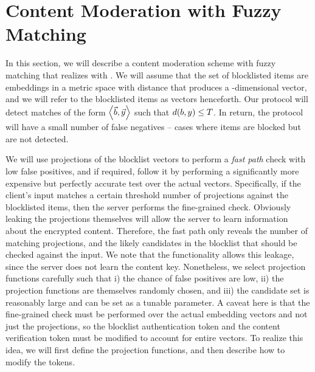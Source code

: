 \section{Content Moderation with Fuzzy Matching}
%


In this section, we will describe a content moderation scheme with fuzzy matching that realizes \contentModFunc with \checkContentFuzzy . We will assume that the set of blocklisted items are embeddings in a metric space with distance \distance that produces a \genericVecLen-dimensional vector, and we will refer to 
the blocklisted items as vectors henceforth. 
Our protocol will detect matches of the form $\tupleDefn{\blocklistVec, \clientVec}$ such that 
$\distanceNotation[\distance][\genericBlocklistElmt][\genericCInputElmt] \le \threshold$. In return, the protocol will have a small number of false negatives -- cases where items are blocked but are not detected. 






%
We will use projections of the blocklist vectors to perform a \emph{fast path} check with low false positives, and if required, follow it by performing  a significantly more expensive but perfectly accurate test over the actual vectors. Specifically, if the client's input matches a certain threshold number of projections against the blocklisted items, then the server performs the fine-grained check. Obviously leaking the projections themselves will allow the server to learn information about the encrypted content. Therefore, the fast path only reveals the number of matching projections, and the likely candidates in the blocklist that should be checked against the input. We note that the \contentModFunc functionality allows this leakage, since the server does not learn the content key.  Nonetheless, we select projection functions carefully such that i) the chance of false positives are low, ii) the projection functions are themselves randomly chosen, and iii) the candidate set is reasonably large and can be set as a tunable parameter. A caveat here is that the fine-grained check must be performed over the actual embedding vectors and not just the projections, so the blocklist authentication token and the content verification token must be modified to account for entire vectors. To realize this idea, we will first define the projection functions, and then describe how to modify the tokens. 

